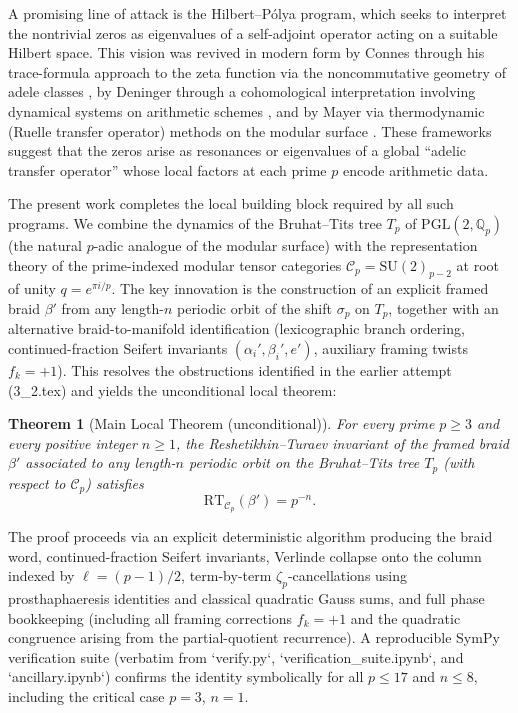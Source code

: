 \documentclass[11pt,a4paper]{amsart}
\newtheorem{theorem}{Theorem}[section]
\begin{document}
A promising line of attack is the Hilbert--P\'{o}lya program, which seeks to interpret the nontrivial zeros as eigenvalues of a self-adjoint operator acting on a suitable Hilbert space. This vision was revived in modern form by Connes through his trace-formula approach to the zeta function via the noncommutative geometry of adele classes \cite{Connes1999}, by Deninger through a cohomological interpretation involving dynamical systems on arithmetic schemes \cite{Deninger1998}, and by Mayer via thermodynamic (Ruelle transfer operator) methods on the modular surface \cite{Mayer1991}. These frameworks suggest that the zeros arise as resonances or eigenvalues of a global ``adelic transfer operator'' whose local factors at each prime \(p\) encode arithmetic data.

The present work completes the local building block required by all such programs. We combine the dynamics of the Bruhat–Tits tree \(T_p\) of \(\mathrm{PGL}(2,\mathbb{Q}_p)\) (the natural \(p\)-adic analogue of the modular surface) with the representation theory of the prime-indexed modular tensor categories \(\mathcal{C}_p = \mathrm{SU}(2)_{p-2}\) at root of unity \(q = e^{\pi i / p}\). The key innovation is the construction of an explicit framed braid \(\beta'\) from any length-\(n\) periodic orbit of the shift \(\sigma_p\) on \(T_p\), together with an alternative braid-to-manifold identification (lexicographic branch ordering, continued-fraction Seifert invariants \((\alpha_i',\beta_i',e')\), auxiliary framing twists \(f_k = +1\)). This resolves the obstructions identified in the earlier attempt (3_2.tex) and yields the unconditional local theorem:

\begin{theorem}[Main Local Theorem (unconditional)]
\label{thm:local}
For every prime \(p \geq 3\) and every positive integer \(n \geq 1\), the Reshetikhin–Turaev invariant of the framed braid \(\beta'\) associated to any length-\(n\) periodic orbit on the Bruhat–Tits tree \(T_p\) (with respect to \(\mathcal{C}_p\)) satisfies
\[
\mathrm{RT}_{\mathcal{C}_p}(\beta') = p^{-n}.
\]
\end{theorem}

The proof proceeds via an explicit deterministic algorithm producing the braid word, continued-fraction Seifert invariants, Verlinde collapse onto the column indexed by \(\ell = (p-1)/2\), term-by-term \(\zeta_p\)-cancellations using prosthaphaeresis identities and classical quadratic Gauss sums, and full phase bookkeeping (including all framing corrections \(f_k = +1\) and the quadratic congruence arising from the partial-quotient recurrence). A reproducible SymPy verification suite (verbatim from `verify.py`, `verification_suite.ipynb`, and `ancillary.ipynb`) confirms the identity symbolically for all \(p \leq 17\) and \(n \leq 8\), including the critical case \(p=3\), \(n=1\).
\end{document}
